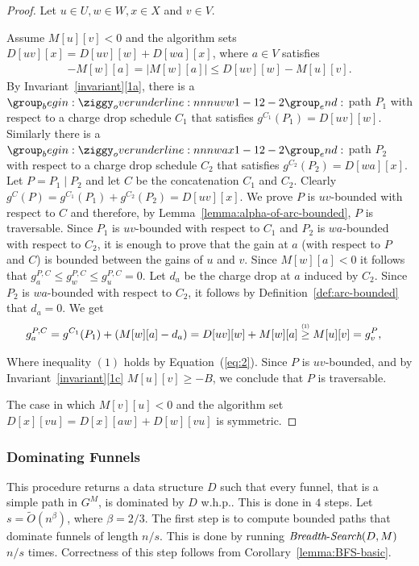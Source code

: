 \documentclass[11pt]{article}
\newcommand{\BFS}{\mbox{{\it Breadth}-{\it Search}}}
\newcommand\numge[1]{\stackrel{\scriptscriptstyle(\mkern-1.5mu#1\mkern-1.5mu)}{\ge}}
\begin{document}
\begin{proof}
    Let $u\in U,w\in W,x\in X$ and $v\in V$.

    Assume $M[u][v]<0$ and the algorithm sets $D[uv][x] = D[uv][w] + D[wa][x]$, where $a\in V$ satisfies 
    \begin{align}\label{eq:2}
     -M[w][a]=|M[w][a]|\le D[uv][w]-M[u][v].   
    \end{align}
    By Invariant~\ref{invariant}\ref{1a}, there is a $\overunderline{uvw}{1-1}{2-2}$ path $P_1$ with respect to a charge drop schedule $C_1$ that satisfies $g^{C_1}(P_1) = D[uv][w]$. Similarly there is a $\overunderline{wax}{1-1}{2-2}$ path $P_2$ with respect to a charge drop schedule $C_2$ that satisfies $g^{C_2}(P_2) = D[wa][x]$. Let $P = P_1\mid P_2$ and let $C$ be the concatenation $C_1$ and $C_2$. Clearly $g^C(P) = g^{C_1}(P_1) + g^{C_2}(P_2) = D[uv][x]$. We prove $P$ is $uv$-bounded with respect to $C$ and therefore, by Lemma~\ref{lemma:alpha-of-arc-bounded}, $P$ is traversable. Since $P_1$ is $uv$-bounded with respect to $C_1$ and $P_2$ is $wa$-bounded with respect to $C_2$, it is enough to prove that the gain at $a$ (with respect to $P$ and $C$) is bounded between the gains of $u$ and $v$. Since $M[w][a]<0$ it follows that $g_a^{P,C} \le g_w^{P,C} \le g_u^{P,C} = 0$. Let $d_a$ be the charge drop at $a$ induced by $C_2$. Since $P_2$ is $wa$-bounded with respect to $C_2$, it follows by Definition~\ref{def:arc-bounded} that $d_a = 0$. We get 
    \begin{align*}
        g_a^{P,C} &= g^{C_1}(P_1) + (M[w][a] - d_a) 
        = D[uv][w] + M[w][a]
        \numge{1} M[u][v] =g_v^P,
    \end{align*}    

    Where inequality $(1)$ holds by Equation~(\ref{eq:2}).
    Since $P$ is $uv$-bounded, and by Invariant~\ref{invariant}\ref{1c} $M[u][v]\ge -B$, we conclude that $P$ is traversable.

    The case in which $M[v][u]<0$ and the algorithm set $D[x][vu] = D[x][aw]+D[w][vu]$ is symmetric.
\end{proof}

\subsubsection{Dominating Funnels}\label{sec:funnels}
This procedure returns a data structure $D$ such that every funnel, that is a simple path
in $G^M$, is dominated by $D$ w.h.p.. This is done in $4$ steps. Let $s = \tilde{O}(n^\beta)$, where $\beta=2/3$. The first step is to compute bounded paths that dominate funnels of length $n/s$. This is done by running $\BFS(D,M)$  $n/s$ times. Correctness of this step follows from Corollary~\ref{lemma:BFS-basic}.
\end{document}
